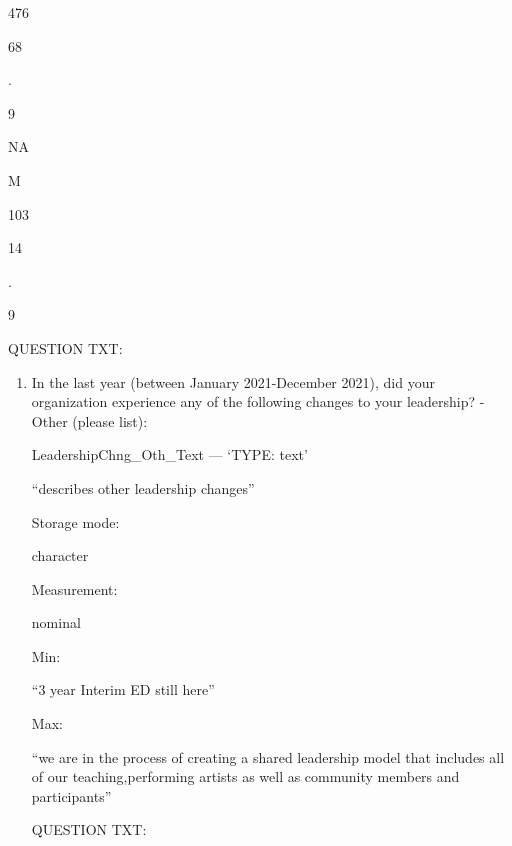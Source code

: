 \documentclass[
  letterpaper,
]{scrbook}
\providecommand{\tightlist}{%
  \setlength{\itemsep}{0pt}\setlength{\parskip}{0pt}}\usepackage{longtable,booktabs,array}
\begin{document}
\begin{enumerate}
\begin{enumerate}
\begin{enumerate}
\begin{enumerate}
\begin{enumerate}
\begin{enumerate}
\begin{enumerate}
\begin{enumerate}
\begin{enumerate}
                  476

                  68

                  .

                  9

                  NA

                  M

                  103

                  14

                  .

                  9

                  QUESTION TXT:

                  \begin{enumerate}
                  \def\labelenumx{\arabic{enumx}.}
                  \tightlist
                  \item
                    In the last year (between January 2021-December
                    2021), did your organization experience any of the
                    following changes to your leadership? - Other
                    (please list):

                    LeadershipChng\_Oth\_Text --- {`TYPE: text'}

                    ``describes other leadership changes''

                    Storage mode:

                    character

                    Measurement:

                    nominal

                    Min:

                    ``3 year Interim ED still here''

                    Max:

                    ``we are in the process of creating a shared
                    leadership model that includes all of our
                    teaching,performing artists as well as community
                    members and participants''

                    QUESTION TXT:


\end{enumerate}
\end{enumerate}
\end{enumerate}
\end{enumerate}
\end{enumerate}
\end{enumerate}
\end{enumerate}
\end{enumerate}
\end{enumerate}
\end{enumerate}
\end{document}

